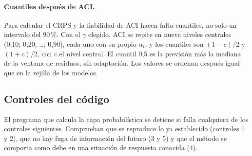 \paragraph{Cuantiles después de ACI.} Para calcular el CRPS y la fiabilidad
de ACI hacen falta cuantiles, no solo un intervalo del 90\,\%. Con el $\gamma$
elegido, ACI se repite en nueve niveles centrales (0,10; 0,20; \ldots; 0,90),
cada uno con su propio $\alpha_t$, y los cuantiles son $(1 - c)/2$ y $(1 + c)/2$,
con $c$ el nivel central. El cuantil 0,5 es la previsión más la mediana de la
ventana de residuos, sin adaptación. Los valores se ordenan después igual que
en la rejilla de los modelos.
\subsection{Controles del código}\label{sec:prob-controles}

El programa que calcula la capa probabilística se detiene si falla cualquiera
de los controles siguientes. Comprueban que se reproduce lo ya establecido
(controles 1 y 2), que no hay fuga de información del futuro (3 y 5) y que
el método se comporta como debe en una situación de respuesta conocida (4).

